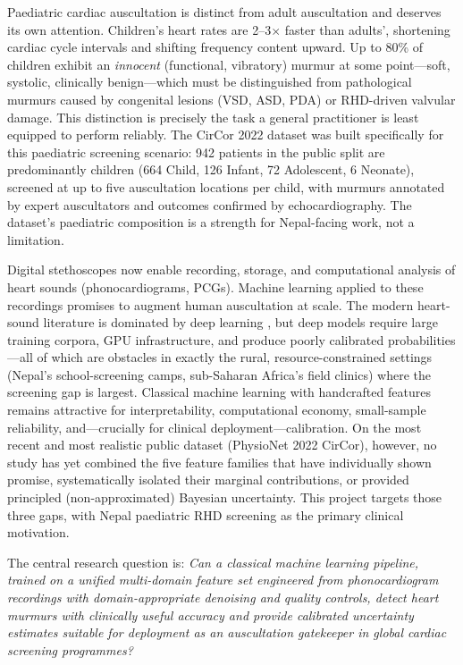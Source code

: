 \documentclass[10pt,twocolumn]{article}
\begin{document}
Paediatric cardiac auscultation is distinct from adult auscultation and deserves its own attention. Children's heart rates are 2--3$\times$ faster than adults', shortening cardiac cycle intervals and shifting frequency content upward. Up to 80\% of children exhibit an \textit{innocent} (functional, vibratory) murmur at some point---soft, systolic, clinically benign---which must be distinguished from pathological murmurs caused by congenital lesions (VSD, ASD, PDA) or RHD-driven valvular damage. This distinction is precisely the task a general practitioner is least equipped to perform reliably. The CirCor 2022 dataset was built specifically for this paediatric screening scenario: 942 patients in the public split are predominantly children (664 Child, 126 Infant, 72 Adolescent, 6 Neonate), screened at up to five auscultation locations per child, with murmurs annotated by expert auscultators and outcomes confirmed by echocardiography. The dataset's paediatric composition is a strength for Nepal-facing work, not a limitation.

Digital stethoscopes now enable recording, storage, and computational analysis of heart sounds (phonocardiograms, PCGs). Machine learning applied to these recordings promises to augment human auscultation at scale. The modern heart-sound literature is dominated by deep learning \citep{challenge2022}, but deep models require large training corpora, GPU infrastructure, and produce poorly calibrated probabilities \citep{guo2017}---all of which are obstacles in exactly the rural, resource-constrained settings (Nepal's school-screening camps, sub-Saharan Africa's field clinics) where the screening gap is largest. Classical machine learning with handcrafted features remains attractive for interpretability, computational economy, small-sample reliability, and---crucially for clinical deployment---calibration. On the most recent and most realistic public dataset (PhysioNet 2022 CirCor), however, no study has yet combined the five feature families that have individually shown promise, systematically isolated their marginal contributions, or provided principled (non-approximated) Bayesian uncertainty. This project targets those three gaps, with Nepal paediatric RHD screening as the primary clinical motivation.

The central research question is: \textit{Can a classical machine learning pipeline, trained on a unified multi-domain feature set engineered from phonocardiogram recordings with domain-appropriate denoising and quality controls, detect heart murmurs with clinically useful accuracy and provide calibrated uncertainty estimates suitable for deployment as an auscultation gatekeeper in global cardiac screening programmes?}
\end{document}
